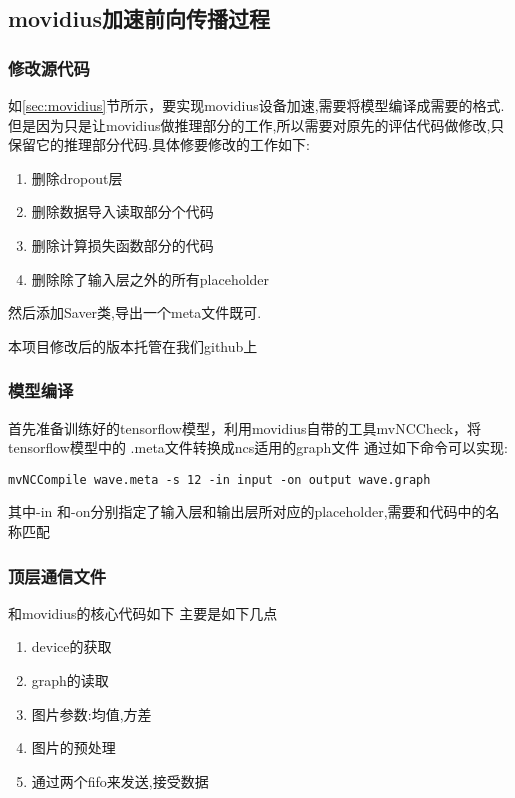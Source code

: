 \subsection{movidius加速前向传播过程}
\subsubsection{修改源代码}

如\ref{sec:movidius}节所示，要实现movidius设备加速,需要将模型编译成需要的格式.
但是因为只是让movidius做推理部分的工作,所以需要对原先的评估代码做修改,只保留它的推理部分代码.具体修要修改的工作如下:
\begin{enumerate}
	\item 删除dropout层
	\item 删除数据导入读取部分个代码
	 \item	删除计算损失函数部分的代码
	 \item	删除除了输入层之外的所有placeholder
\end{enumerate}
然后添加Saver类,导出一个meta文件既可.

本项目修改后的版本托管在我们github\cite{my-nerual-style-tensorflow}上
\subsubsection{模型编译}
首先准备训练好的tensorflow模型，利用movidius自带的工具mvNCCheck，将tensorflow模型中的 .meta文件转换成ncs适用的graph文件
通过如下命令可以实现:
\begin{lstlisting}
mvNCCompile wave.meta -s 12 -in input -on output wave.graph
\end{lstlisting}
其中-in 和-on分别指定了输入层和输出层所对应的placeholder,需要和代码中的名称匹配
\subsubsection{顶层通信文件}
和movidius的核心代码如下
主要是如下几点
\begin{enumerate}
  \item device的获取
  \item graph的读取
  \item	图片参数:均值,方差
  \item	图片的预处理
  \item	通过两个fifo来发送,接受数据
\end{enumerate}
